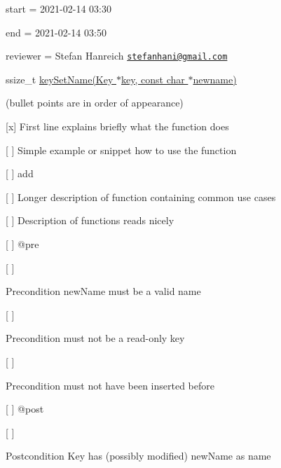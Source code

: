 
\begin{DoxyItemize}
\item start = 2021-\/02-\/14 03\+:30
\item end = 2021-\/02-\/14 03\+:50
\item reviewer = Stefan Hanreich \href{mailto:stefanhani@gmail.com}{\tt stefanhani@gmail.\+com}
\end{DoxyItemize}

{\ttfamily ssize\+\_\+t \hyperlink{group__keyname_ga7699091610e7f3f43d2949514a4b35d9}{key\+Set\+Name(\+Key $\ast$key, const char $\ast$newname)}}

(bullet points are in order of appearance)


\begin{DoxyItemize}
\item \mbox{[}x\mbox{]} First line explains briefly what the function does
\item \mbox{[} \mbox{]} Simple example or snippet how to use the function
\begin{DoxyItemize}
\item \mbox{[} \mbox{]} add
\end{DoxyItemize}
\item \mbox{[} \mbox{]} Longer description of function containing common use cases
\item \mbox{[} \mbox{]} Description of functions reads nicely
\item \mbox{[} \mbox{]} {\ttfamily @pre}
\begin{DoxyItemize}
\item \mbox{[} \mbox{]} \begin{DoxyPrecond}{Precondition}
new\+Name must be a valid name
\end{DoxyPrecond}

\item \mbox{[} \mbox{]} \begin{DoxyPrecond}{Precondition}
must not be a read-\/only key
\end{DoxyPrecond}

\item \mbox{[} \mbox{]} \begin{DoxyPrecond}{Precondition}
must not have been inserted before
\end{DoxyPrecond}

\end{DoxyItemize}
\item \mbox{[} \mbox{]} {\ttfamily @post}
\begin{DoxyItemize}
\item \mbox{[} \mbox{]} \begin{DoxyPostcond}{Postcondition}
Key has (possibly modified) new\+Name as name
\end{DoxyPostcond}


\end{DoxyItemize}
\end{DoxyItemize}
